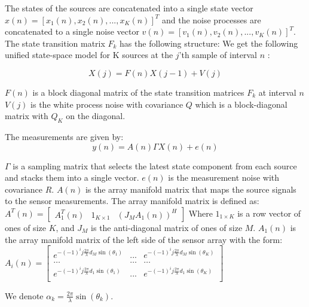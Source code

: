 \documentclass{article}
\begin{document}
The states of the sources are concatenated into a single state vector $x(n) = [x_1(n), x_2(n), ..., x_K(n)]^T$ and the noise processes are concatenated to 
a single noise vector $v(n) = [v_1(n), v_2(n), ..., v_K(n)]^T$.
The state transition matrix $F_k$ has the following structure:
We get the following unified state-space model for K sources at the $j$'th sample of interval $n$ :

\begin{equation}
    X(j) = F(n) X(j-1) + V(j)
\end{equation}

$F(n)$ is a block diagonal matrix of the state transition matrices $F_k$ at interval $n$
$V(j)$ is the white process noise with covariance $Q$ which is a block-diagonal matrix with $Q_K$ on the diagonal.

The measurements are given by:
\begin{equation}
    y(n) = A(n) \Gamma X(n) + e(n)
\end{equation}


$\Gamma$ is a sampling matrix that selects the latest state component from each source and stacks them into a single vector.
$e(n)$ is the measurement noise with covariance $R$.
$A(n)$ is the array manifold matrix that maps the source signals to the sensor measurements.
The array manifold matrix is defined as:
\vspace{1em}
$A^T(n) = \begin{bmatrix}
    A^T_1(n) & 1_{K \times 1} & (J_M A_1(n))^H
\end{bmatrix}$
\vspace{1em}
Where $1_{1\times K}$ is a row vector of ones of size $K$, and $J_M$ is the anti-diagonal matrix of ones of size $M$.
$A_1(n)$ is the array manifold matrix of the left side of the sensor array with the form:
\vspace{1em}
$A_i(n) = \begin{bmatrix}
    e^{-(-1)^ij\frac{2\pi}{\lambda}d_M\sin(\theta_1)} & ... & e^{-(-1)^ij\frac{2\pi}{\lambda}d_M\sin(\theta_K)}\\
    \dots & \dots & \dots \\
    e^{-(-1)^ij\frac{2\pi}{\lambda}d_1\sin(\theta_1)} & ... & e^{-(-1)^ij\frac{2\pi}{\lambda}d_1\sin(\theta_K)}\\
\end{bmatrix}$
\vspace{1em}

We denote $\alpha_k = \frac{2\pi}{\lambda}\sin(\theta_k)$.
\end{document}
